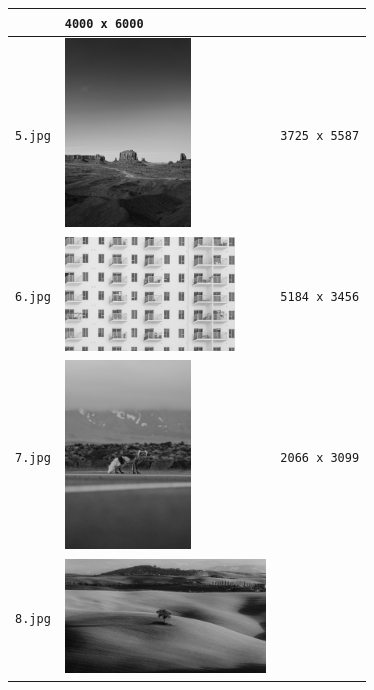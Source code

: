 \begin{longtable}{|c|p{5.5cm}|c|}
\begin{minipage}{.3\textwidth}
  \end{minipage} & \texttt{4000 x 6000} \\ \hline
  \texttt{5.jpg} & \begin{minipage}{.3\textwidth}
    \includegraphics[height=5cm]{chapters/res/appendix-5/5.jpg}
  \end{minipage} & \texttt{3725 x 5587} \\ \hline
  \texttt{6.jpg} & \begin{minipage}{.3\textwidth}
    \includegraphics[height=3cm]{chapters/res/appendix-5/6.jpg}
  \end{minipage} & \texttt{5184 x 3456}  \\ \hline
  \texttt{7.jpg} & \begin{minipage}{.3\textwidth}
    \includegraphics[height=5cm]{chapters/res/appendix-5/7.jpg}
  \end{minipage} & \texttt{2066 x 3099} \\ \hline
  \texttt{8.jpg} & \begin{minipage}{.3\textwidth}
    \includegraphics[height=3cm]{chapters/res/appendix-5/8.jpg}

\end{minipage}
\end{longtable}
